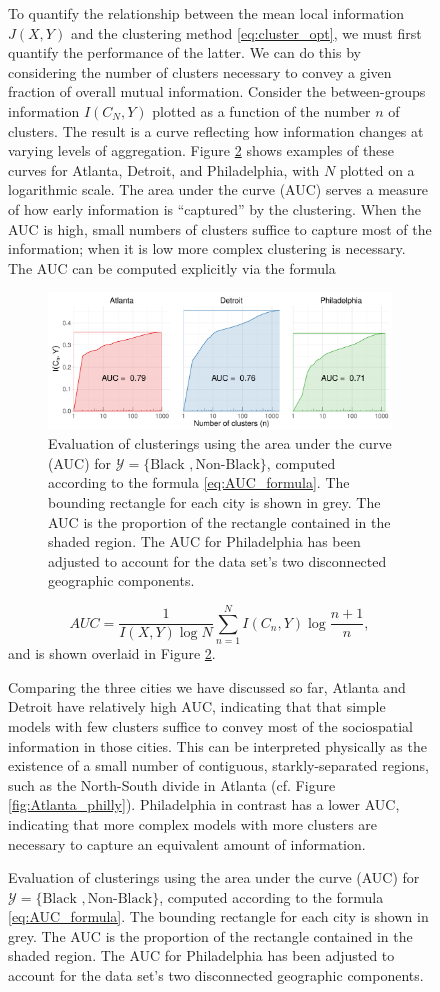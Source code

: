 \documentclass[english]{scrartcl}
\begin{document}
\begin{figure}
		To quantify the relationship between the mean local information $J(X,Y)$ and the clustering method \eqref{eq:cluster_opt}, we must first quantify the performance of the latter. We can do this by considering the number of clusters necessary to convey a given fraction of overall mutual information. Consider the between-groups information $I(C_N,Y)$ plotted as a function of the number $n$ of clusters. The result is a curve reflecting how information changes at varying levels of aggregation. Figure \ref{fig:AUC} shows examples of these curves for Atlanta, Detroit, and Philadelphia, with $N$ plotted on a logarithmic scale. The area under the curve (AUC) serves a measure of how early information is ``captured'' by the clustering. When the AUC is high, small numbers of clusters suffice to capture most of the information; when it is low more complex clustering is necessary. The AUC can be computed explicitly via the formula
		\begin{figure}
			\includegraphics[width=\textwidth]{figs/AUC_illustration.pdf}
			\caption{Evaluation of clusterings using the area under the curve (AUC) for $\mathcal{Y} = \{\text{Black }, \text{Non-Black}\}$, computed according to the formula \eqref{eq:AUC_formula}. The bounding rectangle for each city is shown in grey. The AUC is the proportion of the rectangle contained in the shaded region. The AUC for Philadelphia has been adjusted to account for the data set's two disconnected geographic components.} \label{fig:AUC}
		\end{figure}
		\begin{equation}
			AUC = \frac{1}{I(X,Y) \log N} \sum_{n=1}^N I(C_n, Y) \log \frac{n+1}{n}, \label{eq:AUC_formula}
		\end{equation}
		and is shown overlaid in Figure \ref{fig:AUC}. 

		Comparing the three cities we have discussed so far, Atlanta and Detroit have relatively high AUC, indicating that that simple models with few clusters suffice to convey most of the sociospatial information in those cities. This can be interpreted physically as the existence of a small number of contiguous, starkly-separated regions, such as the North-South divide in Atlanta (cf. Figure \ref{fig:Atlanta_philly}). Philadelphia in contrast has a lower AUC, indicating that more complex models with more clusters are necessary to capture an equivalent amount of information. 


\end{figure}
\end{document}
